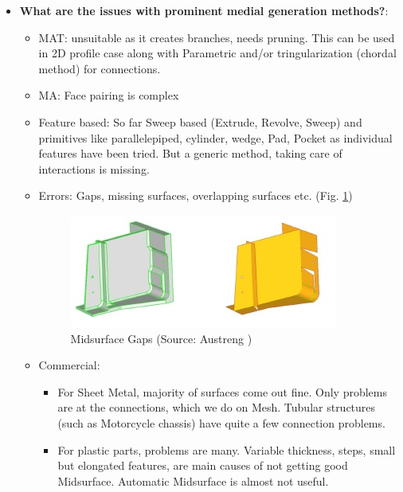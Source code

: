 \begin{itemize}[noitemsep,topsep=2pt,parsep=2pt,partopsep=2pt,leftmargin=*]
\item \textbf{What are the issues with prominent medial generation methods?}: 
	\begin{itemize}[noitemsep,topsep=2pt,parsep=2pt,partopsep=2pt,leftmargin=*]
	\item MAT: unsuitable as it creates branches, needs pruning. This can be used in 2D profile case along with Parametric and/or tringularization (chordal method) for connections.
	\item MA: Face pairing is complex
	\item Feature based: So far Sweep based (Extrude, Revolve, Sweep) and primitives like parallelepiped, cylinder, wedge, Pad, Pocket as individual features have been tried. But a generic method, taking care of interactions is missing.
	\item Errors: Gaps, missing surfaces, overlapping surfaces etc. (Fig. \ref{fig:litsurvey:gaps})
	


		\begin{figure} [h]
		\centering
		\includegraphics[width=0.6\linewidth]{images/MidsurfaceGaps}
		\caption{Midsurface Gaps (Source: Austreng \cite{Austreng2007})}
		\label{fig:litsurvey:gaps}
	\end{figure}
	


	\item Commercial:
		\begin{itemize}[noitemsep,topsep=2pt,parsep=2pt,partopsep=2pt,leftmargin=*]
		\item For Sheet Metal, majority of surfaces come out fine. Only problems are at the connections, which we do on Mesh. Tubular structures (such as Motorcycle chassis) have quite a few connection problems. 
		\item For plastic parts, problems are many. Variable thickness, steps, small but elongated features, are main causes of not getting good Midsurface.  Automatic Midsurface is almost not useful.
	\end{itemize}

	\end{itemize}
	
\end{itemize}	


